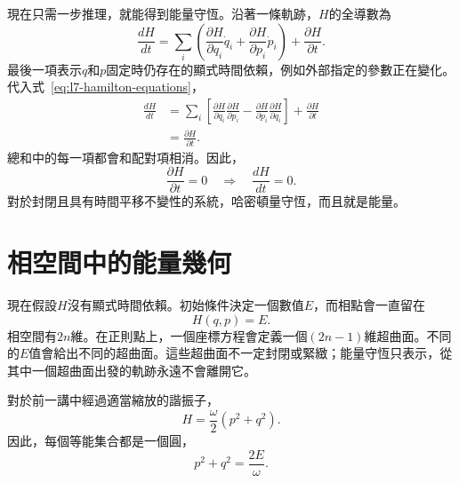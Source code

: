 現在只需一步推理，就能得到能量守恆。沿著一條軌跡，\(H\)的全導數為
\begin{equation}
  \frac{dH}{dt}
  =
  \sum_i\left(
    \frac{\partial H}{\partial q_i}\dot q_i
    +\frac{\partial H}{\partial p_i}\dot p_i
  \right)
  +\frac{\partial H}{\partial t}.
  \label{eq:l7-total-h-derivative}
\end{equation}
最後一項表示\(q\)和\(p\)固定時仍存在的顯式時間依賴，例如外部指定的參數正在變化。代入式~\eqref{eq:l7-hamilton-equations}，
\begin{align}
  \frac{dH}{dt}
  &=
  \sum_i\left[
    \frac{\partial H}{\partial q_i}
    \frac{\partial H}{\partial p_i}
    -\frac{\partial H}{\partial p_i}
    \frac{\partial H}{\partial q_i}
  \right]
  +\frac{\partial H}{\partial t}\\
  &=\frac{\partial H}{\partial t}.
  \label{eq:l7-h-energy-rate}
\end{align}
總和中的每一項都會和配對項相消。因此，
\begin{equation}
  \frac{\partial H}{\partial t}=0
  \quad\Longrightarrow\quad
  \frac{dH}{dt}=0.
  \label{eq:l7-energy-conservation}
\end{equation}
對於封閉且具有時間平移不變性的系統，哈密頓量守恆，而且就是能量。

\begin{classroomqa}
\end{classroomqa}

\section{相空間中的能量幾何}

現在假設\(H\)沒有顯式時間依賴。初始條件決定一個數值\(E\)，而相點會一直留在
\begin{equation}
  H(q,p)=E.
  \label{eq:l7-energy-surface}
\end{equation}
相空間有\(2n\)維。在正則點上，一個座標方程會定義一個\((2n-1)\)維超曲面。不同的\(E\)值會給出不同的超曲面。這些超曲面不一定封閉或緊緻；能量守恆只表示，從其中一個超曲面出發的軌跡永遠不會離開它。

對於前一講中經過適當縮放的諧振子，
\begin{equation}
  H=\frac{\omega}{2}(p^2+q^2).
  \label{eq:l7-oscillator-hamiltonian}
\end{equation}
因此，每個等能集合都是一個圓，
\begin{equation}
  p^2+q^2=\frac{2E}{\omega}.
  \label{eq:l7-oscillator-circle}
\end{equation}

